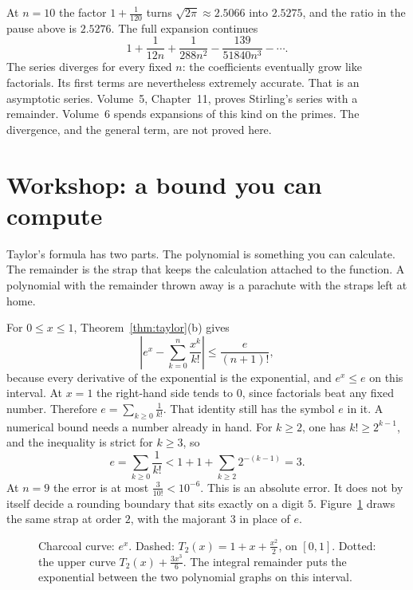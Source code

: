 At $n=10$ the factor $1+\frac1{120}$ turns $\sqrt{2\pi}\approx2.5066$ into $2.5275$, and the ratio in the pause above is $2.5276$. The full expansion continues
\[
1+\frac1{12n}+\frac1{288n^2}-\frac{139}{51840n^3}-\cdots.
\]
The series diverges for every fixed $n$: the coefficients eventually grow like factorials. Its first terms are nevertheless extremely accurate. That is an asymptotic series. Volume~5, Chapter~11, proves Stirling's series with a remainder. Volume~6 spends expansions of this kind on the primes. The divergence, and the general term, are not proved here.


\section{Workshop: a bound you can compute}

Taylor's formula has two parts. The polynomial is something you can calculate. The remainder is the strap that keeps the calculation attached to the function. A polynomial with the remainder thrown away is a parachute with the straps left at home.

\begin{examplex}
For $0\le x\le1$, Theorem~\ref{thm:taylor}(b) gives
\[
\left|e^x-\sum_{k=0}^{n}\frac{x^k}{k!}\right|\le\frac{e}{(n+1)!},
\]
because every derivative of the exponential is the exponential, and $e^x\le e$ on this interval. At $x=1$ the right-hand side tends to $0$, since factorials beat any fixed number. Therefore $e=\sum_{k\ge0}\frac1{k!}$. That identity still has the symbol $e$ in it. A numerical bound needs a number already in hand. For $k\ge2$, one has $k!\ge2^{k-1}$, and the inequality is strict for $k\ge3$, so
\[
e=\sum_{k\ge0}\frac1{k!}<1+1+\sum_{k\ge2}2^{-(k-1)}=3.
\]
At $n=9$ the error is at most $\frac3{10!}<10^{-6}$. This is an absolute error. It does not by itself decide a rounding boundary that sits exactly on a digit $5$. Figure~\ref{fig:review06} draws the same strap at order $2$, with the majorant $3$ in place of $e$.
\end{examplex}

\begin{figure}[ht]\centering{}
\caption{Charcoal curve: $e^x$. Dashed: $T_2(x)=1+x+\frac{x^2}2$, on $[0,1]$. Dotted: the upper curve $T_2(x)+\frac{3x^3}6$. The integral remainder puts the exponential between the two polynomial graphs on this interval.}
\label{fig:review06}
\end{figure}


